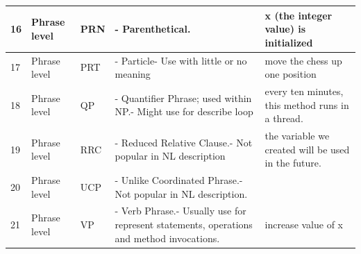\begin{longtable}{|p{}|p{}|p{}|p{}|p{}|}
		\rowcolor[HTML]{9AFF99} 
		16                                                        & Phrase level                                                & PRN                                                        & - Parenthetical.                                                                                                & x (the integer value) is initialized                                            \\ \hline
		\rowcolor[HTML]{9AFF99} 
		17                                                        & Phrase level                                                & PRT                                                        & - Particle- Use with little or no meaning                                                                       & move the chess up one position                                                  \\ \hline
		\rowcolor[HTML]{9AFF99} 
		18                                                        & Phrase level                                                & QP                                                         & - Quantifier Phrase; used within NP.- Might use for describe loop                                               & every ten minutes, this method runs in a thread.                                \\ \hline
		\rowcolor[HTML]{FFFFC7} 
		19                                                        & Phrase level                                                & RRC                                                        & - Reduced Relative Clause.- Not popular in NL description                                                       & the variable we created will be used in the future.                             \\ \hline
		\rowcolor[HTML]{FFFFC7} 
		20                                                        & Phrase level                                                & UCP                                                        & - Unlike Coordinated Phrase.- Not popular in NL description.                                                    &                                                                                 \\ \hline
		\rowcolor[HTML]{FFCCC9} 
		21                                                        & Phrase level                                                & VP                                                         & - Verb Phrase.- Usually use for represent statements, operations and method invocations.                        & increase value of x                                                             \\ \hline

\end{longtable}
